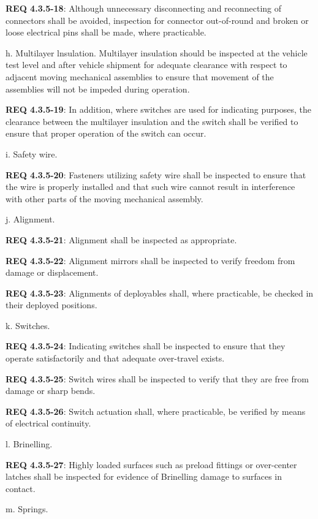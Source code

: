 \documentclass[12pt]{article}
\begin{document}
\noindent \textbf{REQ 4.3.5-18}: Although unnecessary disconnecting and reconnecting of connectors shall be avoided, inspection for connector out-of-round and broken or loose electrical pins shall be made, where practicable.

h. Multilayer lnsulation. 
Multilayer insulation should be inspected at the vehicle test level and after vehicle shipment for adequate clearance with respect to adjacent moving mechanical assemblies to ensure that movement of the assemblies will not be impeded during operation. 

\noindent \textbf{REQ 4.3.5-19}: In addition, where switches are used for indicating purposes, the clearance between the multilayer insulation and the switch shall be verified to ensure that proper operation of the switch can occur.

i. Safety wire. 

\noindent \textbf{REQ 4.3.5-20}: Fasteners utilizing safety wire shall be inspected to ensure that the wire is properly installed and that such wire cannot result in interference with other parts of the moving mechanical assembly.

j. Alignment.

\noindent \textbf{REQ 4.3.5-21}: Alignment shall be inspected as appropriate.

\noindent \textbf{REQ 4.3.5-22}: Alignment mirrors shall be inspected to verify freedom from damage or displacement.

\noindent \textbf{REQ 4.3.5-23}: Alignments of deployables shall, where practicable, be checked in their deployed positions.

k. Switches. 

\noindent \textbf{REQ 4.3.5-24}: Indicating switches shall be inspected to ensure that they operate satisfactorily and that adequate over-travel exists.
 
\noindent \textbf{REQ 4.3.5-25}: Switch wires shall be inspected to verify that they are free from damage or sharp bends. 

\noindent \textbf{REQ 4.3.5-26}: Switch actuation shall, where practicable, be verified by means of electrical continuity.

l. Brinelling.
 
\noindent \textbf{REQ 4.3.5-27}: Highly loaded surfaces such as preload fittings or over-center latches shall be inspected for evidence of Brinelling damage to surfaces in contact.

m. Springs.
 
\end{document}
